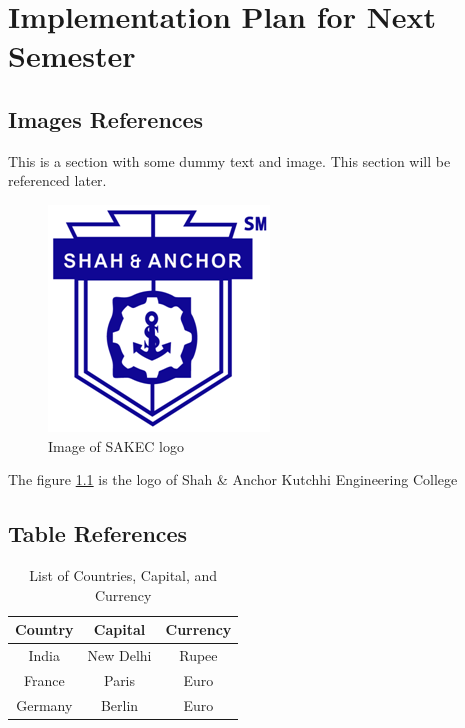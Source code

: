 \chapter{Implementation Plan for Next Semester}

\section{Images References} \label{Img}
This is a section with some dummy text and image. This section will be referenced later.

\begin{figure}[h]
    \centering
    \includegraphics{images/SAKEC_logo.png}
    \caption{Image of SAKEC logo}
    \label{fig:sakeclogo}
\end{figure}

\blindtext %

The figure \ref{fig:sakeclogo} is the logo of Shah \& Anchor Kutchhi Engineering College

\newpage

\section{Table References}
\begin{table}[h]
    \centering
    \caption{List of Countries, Capital, and Currency} 
    \vspace{12pt}
    \begin{tabular}{|c|c|c|}
        \hline
         Country & Capital & Currency\\
         \hline
         India & New Delhi & Rupee\\
         \hline
         France & Paris & Euro\\
         \hline
         Germany & Berlin & Euro \\
         \hline
    \end{tabular}
   
    \label{tab:country}
\end{table}

